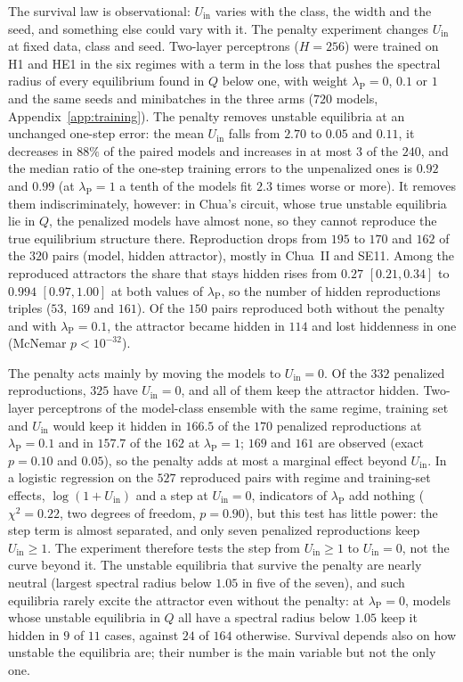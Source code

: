 \documentclass[aip,cha,reprint,amsmath,amssymb,longbibliography]{revtex4-2}
\theoremstyle{definition}
\newcommand{\Uin}{U_{\mathrm{in}}}
\begin{document}
The survival law is observational: $\Uin$ varies with the class, the width and the seed, and something else could vary with
it. The penalty experiment changes $\Uin$ at fixed data, class and seed. Two-layer perceptrons ($H=256$) were trained on H1
and HE1 in the six regimes with a term in the loss that pushes the spectral radius of every equilibrium found in $Q$ below
one, with weight $\lambda_{\mathrm{P}}=0$, $0.1$ or $1$ and the same seeds and minibatches in the three arms ($720$ models,
Appendix~\ref{app:training}). The penalty removes unstable equilibria at an unchanged one-step error: the mean $\Uin$ falls
from $2.70$ to $0.05$ and $0.11$, it decreases in $88\%$ of the paired models and increases in at most $3$ of the $240$, and
the median ratio of the one-step training errors to the unpenalized ones is $0.92$ and $0.99$ (at $\lambda_{\mathrm{P}}=1$ a tenth of the
models fit $2.3$ times worse or more). It removes them indiscriminately, however: in Chua's circuit, whose true unstable
equilibria lie in $Q$, the penalized models have almost none, so they cannot reproduce the true equilibrium structure there. Reproduction drops
from $195$ to $170$ and $162$ of the $320$ pairs (model, hidden attractor), mostly in Chua~II and SE11. Among the reproduced
attractors the share that stays hidden rises from $0.27$ $[0.21,0.34]$ to $0.994$ $[0.97,1.00]$ at both values of $\lambda_{\mathrm{P}}$,
so the number of hidden reproductions triples ($53$, $169$ and $161$). Of the $150$ pairs reproduced both without the
penalty and with $\lambda_{\mathrm{P}}=0.1$, the attractor became hidden in $114$ and lost hiddenness in one (McNemar $p<10^{-32}$).

The penalty acts mainly by moving the models to $\Uin=0$. Of the $332$ penalized reproductions, $325$ have $\Uin=0$, and all
of them keep the attractor hidden. Two-layer perceptrons of the model-class ensemble with the same regime, training set
and $\Uin$ would keep it hidden in $166.5$ of the $170$ penalized reproductions at $\lambda_{\mathrm{P}}=0.1$ and in $157.7$ of
the $162$ at $\lambda_{\mathrm{P}}=1$; $169$ and $161$ are observed (exact $p=0.10$ and $0.05$), so the penalty adds at most
a marginal effect beyond $\Uin$. In a logistic regression on the $527$ reproduced pairs with regime and training-set effects, $\log(1+\Uin)$ and
a step at $\Uin=0$, indicators of $\lambda_{\mathrm{P}}$ add nothing ($\chi^2=0.22$, two degrees of freedom, $p=0.90$), but this test has
little power: the step term is almost separated, and only seven penalized reproductions keep $\Uin\ge1$. The experiment
therefore tests the step from $\Uin\ge1$ to $\Uin=0$, not the curve beyond it. The unstable equilibria that survive the
penalty are nearly neutral (largest spectral radius below $1.05$ in five of the seven), and such equilibria rarely excite
the attractor even without the penalty: at $\lambda_{\mathrm{P}}=0$, models whose unstable equilibria in $Q$ all have a spectral radius below $1.05$ keep it
hidden in $9$ of $11$ cases, against $24$ of $164$ otherwise. Survival depends also on how unstable the equilibria are;
their number is the main variable but not the only one.
\end{document}
